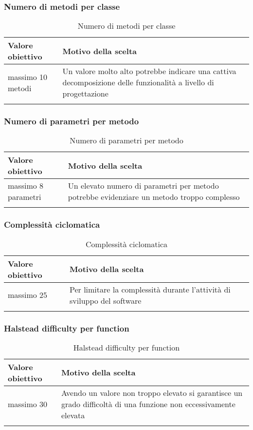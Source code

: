 \documentclass[../PianoDiQualifica_v3.0.0.tex]{subfiles}
\begin{document}
		\subsubsection{Numero di metodi per classe}
			\begin{longtable}[c] { >{\centering\arraybackslash}p{4cm} p{7cm} }
				\toprule
				\centerline{\textbf{Valore obiettivo}} & \centerline{\textbf{Motivo della scelta}} \\
				\midrule
					massimo 10 metodi & Un valore molto alto potrebbe indicare una cattiva decomposizione delle funzionalità a livello di progettazione \\
				\bottomrule
				\caption{Numero di metodi per classe}
			\end{longtable}

		\subsubsection{Numero di parametri per metodo}
			\begin{longtable}[c] { >{\centering\arraybackslash}p{4cm} p{7cm} }
				\toprule
				\centerline{\textbf{Valore obiettivo}} & \centerline{\textbf{Motivo della scelta}} \\
				\midrule
					massimo 8 parametri & Un elevato numero di parametri per metodo potrebbe evidenziare un metodo troppo complesso \\
				\bottomrule
				\caption{Numero di parametri per metodo}
			\end{longtable}

		\subsubsection{Complessità ciclomatica}
			\begin{longtable}[c] { >{\centering\arraybackslash}p{4cm} p{7cm} }
				\toprule
				\centerline{\textbf{Valore obiettivo}} & \centerline{\textbf{Motivo della scelta}} \\
				\midrule
					massimo 25 & Per limitare la complessità durante l'attività di sviluppo del software \\
				\bottomrule
				\caption{Complessità ciclomatica}
			\end{longtable}

		\subsubsection{Halstead difficulty per function}
			\begin{longtable}[c] { >{\centering\arraybackslash}p{4cm} p{7cm} }
				\toprule
				\centerline{\textbf{Valore obiettivo}} & \centerline{\textbf{Motivo della scelta}} \\
				\midrule
					massimo 30 & Avendo un valore non troppo elevato si garantisce un grado difficoltà di una funzione non eccessivamente elevata  \\
				\bottomrule
				\caption{Halstead difficulty per function}
			\end{longtable}
\end{document}

